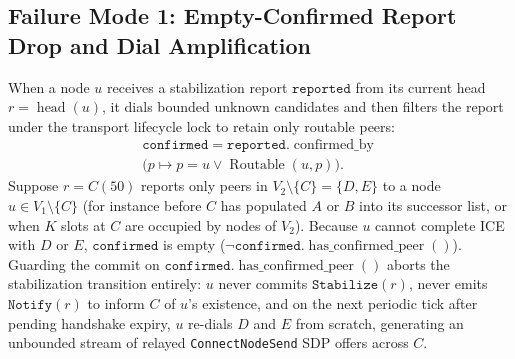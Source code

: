 \documentclass[journal]{IEEEtran}
\newcommand{\Head}{\operatorname{head}}
\begin{document}
\subsection{Failure Mode 1: Empty-Confirmed Report Drop and Dial Amplification}
When a node $u$ receives a stabilization report $\texttt{reported}$ from its
current head $r = \Head(u)$, it dials bounded unknown candidates and then
filters the report under the transport lifecycle lock to retain only routable
peers:
\begin{multline*}
  \texttt{confirmed} = \texttt{reported}.\operatorname{confirmed\_by}\\
  \bigl(p \mapsto p = u \lor \operatorname{Routable}(u, p)\bigr).
\end{multline*}
Suppose $r = C(50)$ reports only peers in $V_2 \setminus \{C\} = \{D, E\}$ to a
node $u \in V_1 \setminus \{C\}$ (for instance before $C$ has populated $A$ or
$B$ into its successor list, or when $K$ slots at $C$ are occupied by nodes of
$V_2$). Because $u$ cannot complete ICE with $D$ or $E$, $\texttt{confirmed}$ is
empty ($\neg\texttt{confirmed}.\operatorname{has\_confirmed\_peer}()$). Guarding
the commit on $\texttt{confirmed}.\operatorname{has\_confirmed\_peer}()$ aborts
the stabilization transition entirely: $u$ never commits
$\texttt{Stabilize}(r)$, never emits $\texttt{Notify}(r)$ to inform $C$ of $u$'s
existence, and on the next periodic tick after pending handshake expiry, $u$
re-dials $D$ and $E$ from scratch, generating an unbounded stream of relayed
\texttt{ConnectNodeSend} SDP offers across $C$.
\end{document}
